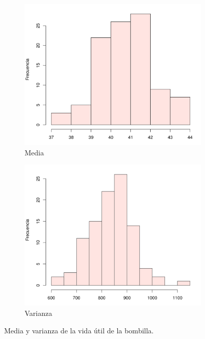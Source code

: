 \documentclass[12pt]{article}
\begin{document}
	\begin{figure}
		\begin{subfigure}{0.5\textwidth}
			\centering
			\includegraphics[scale=0.5]{lb_mean.png}
			\caption{Media}
			\label{lb-mean}
		\end{subfigure}
		\begin{subfigure}{0.5\textwidth}
			\centering
			\includegraphics[scale=0.5]{lb_var.png}
			\caption{Varianza}
			\label{lb-var}
		\end{subfigure}
	\caption{Media y varianza de la vida útil de la bombilla.}
	\label{lb}
	\end{figure}
	
	


\end{document}
